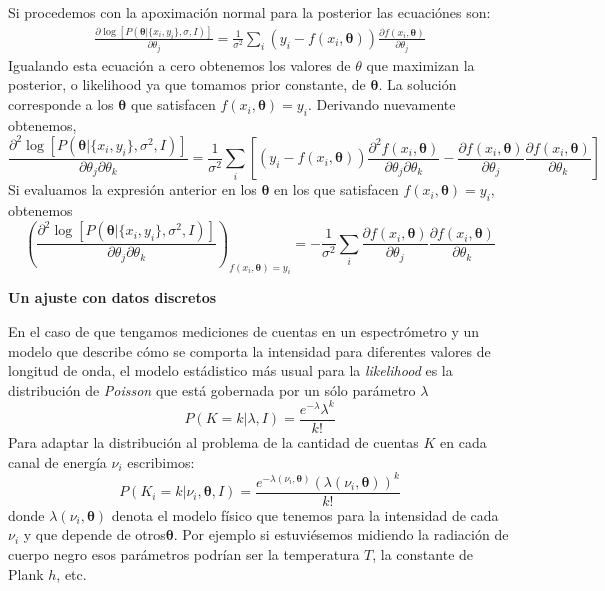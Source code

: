 \documentclass[aps,onecolumn,12pt,notitlepage]{revtex4-1}
\begin{document}
Si procedemos con la apoximación normal para la posterior las ecuaciónes son:
\begin{align}
\frac{ \partial \log \left[P \left( \boldsymbol{\theta} | \{ x_{i},y_{i} \},\sigma ,I \right)\right]}{ \partial \theta_{j}}  = \frac{1}{\sigma^2} \sum_{i} \left(y_{i} - f(x_{i},\boldsymbol{\theta})\right)\frac{\partial f(x_{i},\boldsymbol{\theta})}{\partial \theta_{j}}
\end{align}
Igualando esta ecuación a cero obtenemos los valores de $\theta$ que maximizan la posterior, o likelihood ya que tomamos prior constante, de $\boldsymbol{\theta}$. La solución corresponde a los $\boldsymbol{\theta}$ que satisfacen $f(x_{i},\boldsymbol{\theta}) = y_{i}$. 
Derivando nuevamente obtenemos,
\begin{equation}
\frac{\partial^{2} \log \left[P\left(\boldsymbol{\theta} | \{ x_{i},y_{i} \},\sigma^{2},I \right)\right]}{ \partial \theta_{j} \partial \theta_{k}} = \frac{1}{\sigma^2} \sum_{i} \left[ \left(y_{i} - f(x_{i},\boldsymbol{\theta})\right) \frac{\partial^2 f(x_{i},\boldsymbol{\theta})}{\partial \theta_{j} \partial \theta_{k}}  - \frac{\partial f(x_{i},\boldsymbol{\theta})}{\partial \theta_{j}} \frac{\partial f(x_{i},\boldsymbol{\theta})}{\partial \theta_{k}}\right]
\end{equation}
Si evaluamos la expresión anterior en los $\boldsymbol{\theta}$ en los que satisfacen $f(x_{i},\boldsymbol{\theta}) = y_{i}$, obtenemos
\begin{equation}
\left( \frac{\partial^{2} \log \left[P\left(\boldsymbol{\theta} | \{ x_{i},y_{i} \},\sigma^{2},I \right)\right]}{ \partial \theta_{j} \partial \theta_{k}} \right)_{f(x_{i},\boldsymbol{\theta}) = y_{i}}  = -\frac{1}{\sigma^2} \sum_{i} \frac{\partial f(x_{i},\boldsymbol{\theta})}{\partial \theta_{j}} \frac{\partial f(x_{i},\boldsymbol{\theta})}{\partial \theta_{k}}
\end{equation}

\textbf{Un ajuste con datos discretos}

En el caso de que tengamos mediciones de cuentas en un espectrómetro y un modelo que describe cómo se comporta la intensidad para diferentes valores de longitud de onda, el modelo estádistico más usual para la \textit{likelihood} es la distribución de \textit{ Poisson} que está gobernada por un sólo parámetro $\lambda$
\begin{equation}
P(K = k|\lambda,I) = \frac{e^{-\lambda} \lambda^k}{k!}
\end{equation}
Para adaptar la distribución al problema de la cantidad de cuentas $K$ en cada canal de energía $\nu_{i}$ escribimos:
\begin{equation}
P\left(K_{i} = k|\nu_{i},\boldsymbol{\theta},I\right) = \frac{e^{-\lambda(\nu_{i},\boldsymbol{\theta})} \left(\lambda(\nu_{i},\boldsymbol{\theta})\right)^k}{k!}
\end{equation}
donde $\lambda(\nu_{i},\boldsymbol{\theta})$ denota el modelo físico que tenemos para la intensidad de cada $\nu_{i}$ y que depende de otros$\boldsymbol{\theta}$. Por ejemplo si estuviésemos midiendo la radiación de cuerpo negro esos parámetros podrían ser la temperatura $T$, la constante de Plank $h$, etc.
\end{document}
